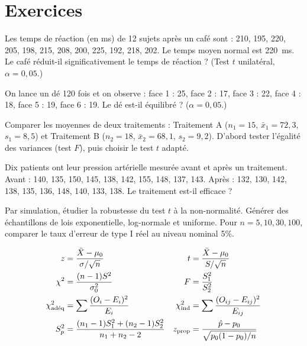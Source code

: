 \section{Exercices}

\begin{exercice}
Les temps de r\'eaction (en ms) de 12 sujets apr\`es un caf\'e sont : 210, 195, 220, 205, 198, 215, 208, 200, 225, 192, 218, 202. Le temps moyen normal est 220~ms. Le caf\'e r\'eduit-il significativement le temps de r\'eaction ? (Test $t$ unilat\'eral, $\alpha=0{,}05$.)
\end{exercice}

\begin{exercice}
On lance un d\'e 120 fois et on observe : face 1 : 25, face 2 : 17, face 3 : 22, face 4 : 18, face 5 : 19, face 6 : 19. Le d\'e est-il \'equilibr\'e ? ($\alpha=0{,}05$.)
\end{exercice}

\begin{exercice}
Comparer les moyennes de deux traitements : Traitement A ($n_1=15$, $\bar{x}_1=72{,}3$, $s_1=8{,}5$) et Traitement B ($n_2=18$, $\bar{x}_2=68{,}1$, $s_2=9{,}2$). D'abord tester l'\'egalit\'e des variances (test $F$), puis choisir le test $t$ adapt\'e.
\end{exercice}

\begin{exercice}
Dix patients ont leur pression art\'erielle mesur\'ee avant et apr\`es un traitement. Avant : 140, 135, 150, 145, 138, 142, 155, 148, 137, 143. Apr\`es : 132, 130, 142, 138, 135, 136, 148, 140, 133, 138. Le traitement est-il efficace ?
\end{exercice}

\begin{exercice}
Par simulation, \'etudier la robustesse du test $t$ \`a la non-normalit\'e. G\'en\'erer des \'echantillons de lois exponentielle, log-normale et uniforme. Pour $n=5,10,30,100$, comparer le taux d'erreur de type I r\'eel au niveau nominal 5\%.
\end{exercice}

\begin{formules}
\begin{align*}
z &= \frac{\bar{X}-\mu_0}{\sigma/\sqrt{n}} & t &= \frac{\bar{X}-\mu_0}{S/\sqrt{n}} \\
\chi^2 &= \frac{(n-1)S^2}{\sigma_0^2} & F &= \frac{S_1^2}{S_2^2} \\
\chi^2_{\text{ad\'eq}} &= \sum\frac{(O_i-E_i)^2}{E_i} & \chi^2_{\text{ind}} &= \sum\frac{(O_{ij}-E_{ij})^2}{E_{ij}} \\
S_p^2 &= \frac{(n_1-1)S_1^2+(n_2-1)S_2^2}{n_1+n_2-2} & z_{\text{prop}} &= \frac{\hat{p}-p_0}{\sqrt{p_0(1-p_0)/n}}
\end{align*}
\end{formules}
